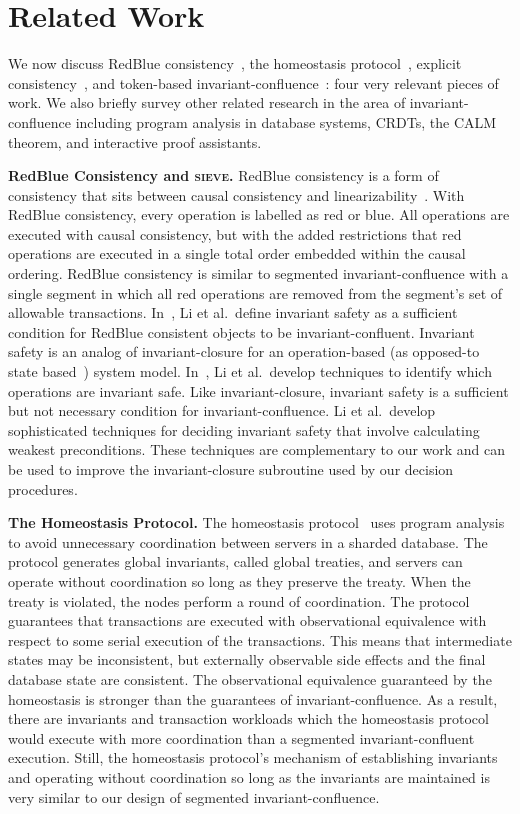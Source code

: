 \section{Related Work}
We now discuss RedBlue consistency~\cite{li2012making, li2014automating}, the
homeostasis protocol~\cite{roy2015homeostasis}, explicit
consistency~\cite{balegas2015putting}, and token-based
invariant-confluence~\cite{gotsman2016cause}: four very relevant pieces of
work. We also briefly survey other related research in the area of
invariant-confluence including program analysis in database systems, CRDTs, the
CALM theorem, and interactive proof assistants.

\newcommand{\sieve}{\textsc{sieve}}
\textbf{RedBlue Consistency and \sieve.}
RedBlue consistency is a form of consistency that sits between causal
consistency and linearizability~\cite{li2012making}. With RedBlue consistency,
every operation is labelled as red or blue. All operations are executed with
causal consistency, but with the added restrictions that red operations are
executed in a single total order embedded within the causal ordering.
RedBlue consistency is similar to segmented invariant-confluence with a single
segment in which all red operations are removed from the segment's set of
allowable transactions. In~\cite{li2012making}, Li et al.\ define
invariant safety as a sufficient condition for RedBlue consistent objects to be
invariant-confluent. Invariant safety is an analog of invariant-closure for an
operation-based (as opposed-to state based~\cite{shapiro2011conflict}) system
model. In~\cite{li2014automating}, Li et al.\ develop techniques to identify
which operations are invariant safe.  Like invariant-closure, invariant safety
is a sufficient but not necessary condition for invariant-confluence. Li et
al.\ develop sophisticated techniques for deciding invariant safety that
involve calculating weakest preconditions.  These techniques are complementary
to our work and can be used to improve the invariant-closure subroutine used by
our decision procedures.

\textbf{The Homeostasis Protocol.}
The homeostasis protocol~\cite{roy2015homeostasis} uses program analysis to
avoid unnecessary coordination between servers in a sharded database. The
protocol generates global invariants, called global treaties, and servers can
operate without coordination so long as they preserve the treaty. When the
treaty is violated, the nodes perform a round of coordination. The protocol
guarantees that transactions are executed with observational equivalence with
respect to some serial execution of the transactions. This means that
intermediate states may be inconsistent, but externally observable side effects
and the final database state are consistent. The observational equivalence
guaranteed by the homeostasis is stronger than the guarantees of
invariant-confluence. As a result, there are invariants and transaction
workloads which the homeostasis protocol would execute with more coordination
than a segmented invariant-confluent execution. Still, the homeostasis
protocol's mechanism of establishing invariants and operating without
coordination so long as the invariants are maintained is very similar to our
design of segmented invariant-confluence.

